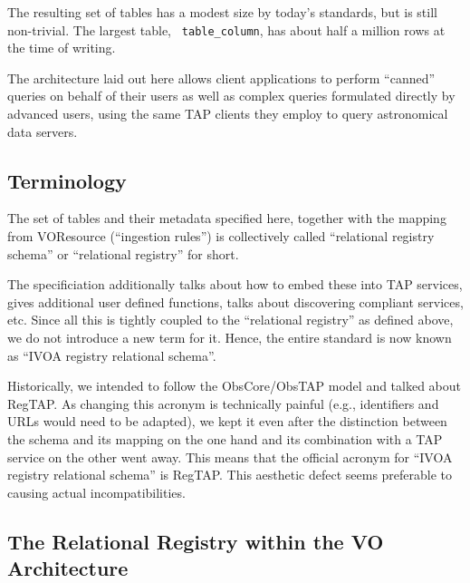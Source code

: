\documentclass[11pt,a4paper]{ivoa}
\newcommand{\rtent}[1]{\texttt{\color{rtcolor} #1}}
\begin{document}
The resulting set of tables has a modest size by today's standards,
but is still non-trivial.  The largest table, \rtent{table\_column},
has about half a million rows at the time of writing.

The architecture laid out here allows client applications to perform ``canned''
queries on behalf of their users as well as complex queries formulated
directly by advanced users, using the same TAP clients they employ to
query astronomical data servers.



\subsection{Terminology}

\label{terms}

The set of tables and their metadata specified here, together with
the mapping from VOResource (``ingestion rules'') is collectively
called ``relational registry schema'' or ``relational registry'' for
short.

The specificiation additionally talks about how to embed these into TAP
services, gives additional user defined functions, talks about
discovering compliant services, etc.  Since all this is tightly coupled
to the ``relational registry'' as defined above, we do not 
introduce a new term for it.  Hence, the entire standard is now known as
``IVOA registry relational schema''.

Historically, we intended to follow the ObsCore/ObsTAP model and
talked about RegTAP.  As changing this acronym is technically painful
(e.g., identifiers and URLs would need to be adapted), we kept it even after
the distinction between the schema and its mapping on the one hand and
its combination with a TAP service on the other went away.  This
means that the official acronym for ``IVOA registry relational schema'' is
RegTAP.  This aesthetic defect seems preferable to causing actual
incompatibilities.




\subsection{The Relational Registry within the VO Architecture}

\label{rolewithinivoa}
\end{document}
